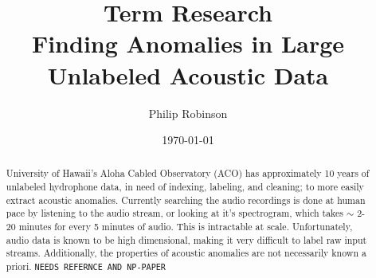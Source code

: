 \documentclass{article}
\title{Term Research \\ Finding Anomalies in Large Unlabeled Acoustic Data}
\date{\today}
\author{Philip Robinson}
\affil{Oregon Health Sciences University}
\begin{document}
\maketitle

\def\aa{acoustic anomalies\xspace}
\def\ae{Auto-Encoders\xspace}
\def\vae{Variational \ae\xspace}
\def\gumiho{Gumiho Network\xspace}
\def\condgen{Conditional Generating Network\xspace}
\def\desc{Descriminator Network\xspace}

\def\np{Neyman-Pearson Lemma\xspace}
\def\pdf{probability density function\xspace}
\def\fpr{false positive rate\xspace}
\def\tfpr{true/false positive rate\xspace}
\def\tpr{true positive rate\xspace}
\def\keras{\texttt{keras}\xspace}
\def\pytorch{\texttt{pytorch}\cite{paszke2017automatic}\xspace}
\def\tensorflow{\texttt{tensorflow}\xspace}
\def\ray{\texttt{ray}\xspace}

\def\encoder{\texttt{encoder}\xspace}
\def\decoder{\texttt{decoder}\xspace}
\def\bottle{\texttt{bottle}\xspace}
\def\GMM{\texttt{GMM}\xspace}



\begin{abstract}
University of Hawaii's Aloha Cabled Observatory (ACO) has approximately 10 years
of unlabeled hydrophone data, in need of indexing, labeling, and cleaning; to more
easily extract \aa.
Currently searching the audio recordings is done at human pace by listening
to the audio stream, or looking at it's spectrogram, which takes $\sim$ 2-20 minutes
for every 5 minutes of audio. This is intractable at scale.
Unfortunately, audio data is known to be high dimensional, making it
very difficult to label raw input streams. Additionally, the properties of
\aa are not necessarily known a priori.  \texttt{NEEDS REFERNCE AND NP-PAPER}

\end{abstract}
\end{document}
